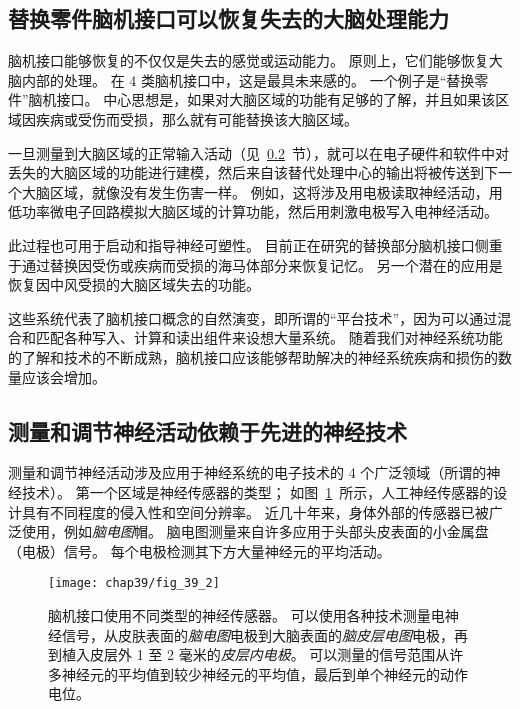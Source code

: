 \subsection{替换零件脑机接口可以恢复失去的大脑处理能力}

脑机接口能够恢复的不仅仅是失去的感觉或运动能力。
原则上，它们能够恢复大脑内部的处理。
在 4 类脑机接口中，这是最具未来感的。
一个例子是“替换零件”脑机接口。
中心思想是，如果对大脑区域的功能有足够的了解，并且如果该区域因疾病或受伤而受损，那么就有可能替换该大脑区域。


一旦测量到大脑区域的正常输入活动（见~\ref{sec:39_1_5}~节），就可以在电子硬件和软件中对丢失的大脑区域的功能进行建模，然后来自该替代处理中心的输出将被传送到下一个大脑区域，就像没有发生伤害一样。
例如，这将涉及用电极读取神经活动，用低功率微电子回路模拟大脑区域的计算功能，然后用刺激电极写入电神经活动。


此过程也可用于启动和指导神经可塑性。
目前正在研究的替换部分脑机接口侧重于通过替换因受伤或疾病而受损的海马体部分来恢复记忆。
另一个潜在的应用是恢复因中风受损的大脑区域失去的功能。


这些系统代表了脑机接口概念的自然演变，即所谓的“平台技术”，因为可以通过混合和匹配各种写入、计算和读出组件来设想大量系统。
随着我们对神经系统功能的了解和技术的不断成熟，脑机接口应该能够帮助解决的神经系统疾病和损伤的数量应该会增加。



\subsection{测量和调节神经活动依赖于先进的神经技术} \label{sec:39_1_5}

测量和调节神经活动涉及应用于神经系统的电子技术的 4 个广泛领域（所谓的神经技术）。
第一个区域是神经传感器的类型；
如图~\ref{fig:39_2}~所示，人工神经传感器的设计具有不同程度的侵入性和空间分辨率。
近几十年来，身体外部的传感器已被广泛使用，例如\textit{脑电图}帽。
脑电图测量来自许多应用于头部头皮表面的小金属盘（电极）信号。
每个电极检测其下方大量神经元的平均活动。


\begin{figure}[htbp]
	\centering
	\texttt{[image: chap39/fig\_39\_2]}
	\caption{脑机接口使用不同类型的神经传感器。 
		可以使用各种技术测量电神经信号，从皮肤表面的\textit{脑电图}电极到大脑表面的\textit{脑皮层电图}电极，再到植入皮层外 1 至 2 毫米的\textit{皮层内电极}。
		可以测量的信号范围从许多神经元的平均值到较少神经元的平均值，最后到单个神经元的动作电位\cite{blabe2015assessment}。}
	\label{fig:39_2}
\end{figure}


